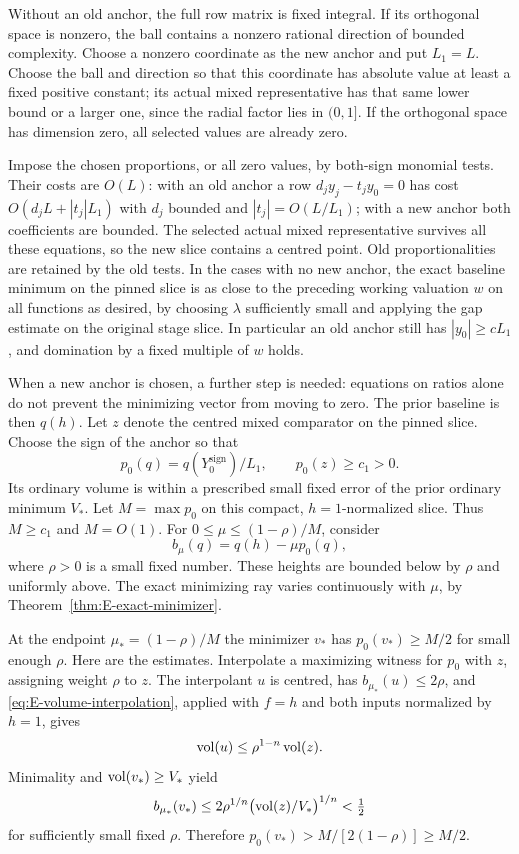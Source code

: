 Without an old anchor, the full row matrix is fixed integral.  If its
orthogonal space is nonzero, the ball contains a nonzero rational
direction of bounded complexity.  Choose a nonzero coordinate as the
new anchor and put $L_1=L$.  Choose the ball and direction so that this
coordinate has absolute value at least a fixed positive constant; its
actual mixed representative has that same lower bound or a larger one,
since the radial factor lies in $(0,1]$.  If the orthogonal space has
dimension zero, all selected values are already zero.

Impose the chosen proportions, or all zero values, by both-sign
monomial tests.  Their costs are $O(L)$: with an old anchor a row
$d_jy_j-t_jy_0=0$ has cost $O(d_jL+|t_j|L_1)$ with $d_j$ bounded and
$|t_j|=O(L/L_1)$; with a new anchor both coefficients are bounded.
The selected actual mixed representative survives all these equations,
so the new slice contains a centred point.  Old proportionalities are
retained by the old tests.  In the cases with no new anchor, the exact
baseline minimum on the pinned slice is as close to the preceding
working valuation $w$ on all functions as desired, by choosing
$\lambda$ sufficiently small and applying the gap estimate on the
original stage slice.  In particular an old anchor still has
$|y_0|\ge cL_1$, and domination by a fixed multiple of $w$ holds.

When a new anchor is chosen, a further step is needed: equations on
ratios alone do not prevent the minimizing vector from moving to zero.
The prior baseline is then $q(h)$.  Let $z$ denote the centred mixed
comparator on the pinned slice.  Choose the sign of the anchor so that
\[
 p_0(q)=q(Y_0^{\mathrm{sign}})/L_1,
 \qquad p_0(z)\ge c_1>0.
\]
Its ordinary volume is within a prescribed small fixed error of the
prior ordinary minimum $V_*$.  Let $M=\max p_0$ on this compact,
$h=1$-normalized slice.  Thus $M\ge c_1$ and $M=O(1)$.  For
$0\le\mu\le(1-\rho)/M$, consider
\begin{equation}\label{eq:G-anchor-height}
                              b_\mu(q)=q(h)-\mu p_0(q),
\end{equation}
where $\rho>0$ is a small fixed number.  These heights are bounded below
by $\rho$ and uniformly above.  The exact minimizing ray varies
continuously with $\mu$, by Theorem~\ref{thm:E-exact-minimizer}.

At the endpoint $\mu_*=(1-\rho)/M$ the minimizer $v_*$ has
$p_0(v_*)\ge M/2$ for small enough $\rho$.  Here are the estimates.
Interpolate a maximizing witness for $p_0$ with $z$, assigning weight
$\rho$ to $z$.  The interpolant $u$ is centred, has
$b_{\mu_*}(u)\le2\rho$, and \eqref{eq:E-volume-interpolation}, applied
with $f=h$ and both inputs normalized by $h=1$, gives
\[
                         \operatorname{vol}(u)\le\rho^{1-n}\operatorname{vol}(z).
\]
Minimality and $\operatorname{vol}(v_*)\ge V_*$ yield
\[
 b_{\mu_*}(v_*)
 \le2\rho^{1/n}\bigl(\operatorname{vol}(z)/V_*\bigr)^{1/n}<\tfrac12
\]
for sufficiently small fixed $\rho$.  Therefore
$p_0(v_*)>M/[2(1-\rho)]\ge M/2$.

